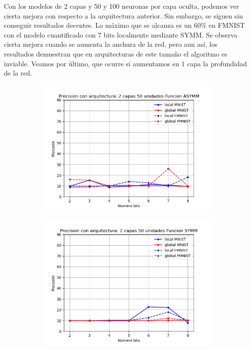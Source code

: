 Con los modelos de 2 capas y 50 y 100 neuronas por capa oculta, podemos ver cierta mejora con respecto a la arquitectura anterior. Sin embargo, se siguen sin conseguir resultados decentes. Lo máximo que se alcanza es un 60\% en FMNIST con el modelo cuantificado con 7 bits localmente mediante SYMM. Se observa cierta mejora cuando se aumenta la anchura de la red, pero aun así, los resultados demuestran que en arquitecturas de este tamaño el algoritmo es inviable. Veamos por último, que ocurre si aumentamos en 1 capa la profundidad de la red. 

\begin{figure}[H]
    \centering
    \begin{subfigure}[H]{0.475\textwidth}
    \includegraphics[width=\textwidth]{imagenes/dni/Precision con arquitectura: 2 capas 50 unidades Funcion ASYMM.png}
    \end{subfigure}
    \begin{subfigure}[H]{0.475\textwidth}
    \includegraphics[width=\textwidth]{imagenes/dni/Precision con arquitectura: 2 capas 50 unidades Funcion SYMM.png}

\end{subfigure}
\end{figure}
